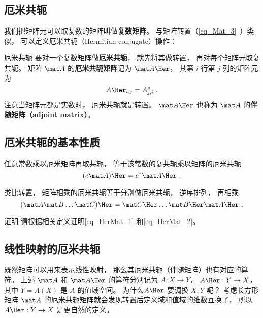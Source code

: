 

\subsection{厄米共轭}
我们把矩阵元可以取复数的矩阵叫做\textbf{复数矩阵}。 %
与矩阵转置（\autoref{eq_Mat_3}~）类似， 可以定义厄米共轭（Hermitian conjugate）操作：

\begin{definition}{厄米共轭}
要对一个复数矩阵做\textbf{厄米共轭}， 就先将其做转置， 再对每个矩阵元取复共轭。 矩阵 $\mat A$ 的\textbf{厄米共轭矩阵}记为 $\mat A\Her$， 其第 $i$ 行第 $j$ 列的矩阵元为
\begin{equation}
A\Her_{i,j} = A_{j,i}^*~.
\end{equation}
注意当矩阵元都是实数时， 厄米共轭就是转置。 $\mat A\Her$ 也称为 $\mat A$ 的\textbf{伴随矩阵（adjoint matrix）}。
\end{definition}

\subsection{厄米共轭的基本性质}
任意常数乘以厄米矩阵再取共轭， 等于该常数的复共轭乘以矩阵的厄米共轭
\begin{equation}\label{eq_HerMat_1}
(c \mat A)\Her = c^* \mat A\Her~.
\end{equation}

类比转置，%
矩阵相乘的厄米共轭等于分别做厄米共轭， 逆序排列， 再相乘
\begin{equation}\label{eq_HerMat_2}
(\mat A \mat B \dots \mat C)\Her  = \mat C\Her \dots \mat B\Her \mat A\Her~.
\end{equation}

\begin{exercise}{证明}
请根据相关定义证明\autoref{eq_HerMat_1} 和\autoref{eq_HerMat_2}。
\end{exercise}

\subsection{线性映射的厄米共轭}
既然矩阵可以用来表示线性映射， 那么其厄米共轭（伴随矩阵）也有对应的算符。 上述 $\mat A$ 和 $\mat A\Her$ 的算符分别记为 $A:X\to Y$， $A\Her: Y\to X$， 其中 $Y = A(X)$ 是 $A$ 的值域空间。 为什么$A\Her$ 要调换 $X, Y$ 呢？ 考虑长方形矩阵 $\mat A$ 的厄米共轭矩阵就会发现转置后定义域和值域的维数互换了， 所以 $A\Her:Y\to X$ 是更自然的定义。

